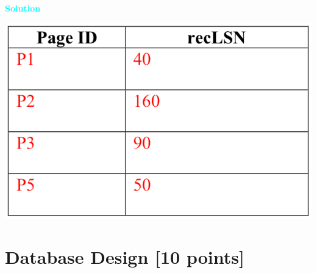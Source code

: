 \documentclass[10pt]{article}
\newenvironment{solution}
    { \begin{mdframed}[backgroundcolor=gray!10] \textcolor{cyan}{\textbf{Solution}} \\}
    {  \end{mdframed}}
\begin{document}
\begin{enumerate}
\begin{itemize}
		            \begin{solution}
			            \begin{center}
				            \includegraphics[width=.45\linewidth]{DPT_sol.png}
			            \end{center}
		            \end{solution}
	      \end{itemize}

\end{enumerate}




\newpage
\section{Database Design \textbf{[10 points]}}
\end{document}

